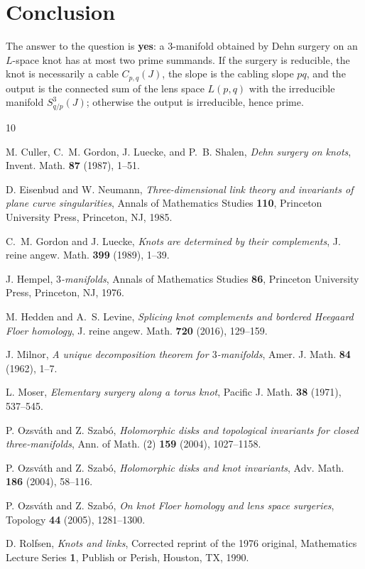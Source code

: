 \documentclass[11pt]{article}
\theoremstyle{definition}
\theoremstyle{remark}
\numberwithin{equation}{section}
\begin{document}
\section*{Conclusion}

The answer to the question is \textbf{yes}: a $3$-manifold obtained by
Dehn surgery on an $L$-space knot has at most two prime summands.  If
the surgery is reducible, the knot is necessarily a cable $C_{p,q}(J)$,
the slope is the cabling slope $pq$, and the output is the connected sum
of the lens space $L(p,q)$ with the irreducible manifold
$S^{3}_{q/p}(J)$; otherwise the output is irreducible, hence prime.

\begin{thebibliography}{10}

M. Culler, C.~M. Gordon, J. Luecke, and P.~B. Shalen,
\emph{Dehn surgery on knots},
Invent. Math. \textbf{87} (1987), 1--51.

D. Eisenbud and W. Neumann,
\emph{Three-dimensional link theory and invariants of plane curve
singularities},
Annals of Mathematics Studies \textbf{110}, Princeton University Press,
Princeton, NJ, 1985.

C.~M. Gordon and J. Luecke,
\emph{Knots are determined by their complements},
J. reine angew. Math. \textbf{399} (1989), 1--39.

J. Hempel,
\emph{$3$-manifolds},
Annals of Mathematics Studies \textbf{86}, Princeton University Press,
Princeton, NJ, 1976.

M. Hedden and A.~S. Levine,
\emph{Splicing knot complements and bordered Heegaard Floer homology},
J. reine angew. Math. \textbf{720} (2016), 129--159.

J. Milnor,
\emph{A unique decomposition theorem for $3$-manifolds},
Amer. J. Math. \textbf{84} (1962), 1--7.

L. Moser,
\emph{Elementary surgery along a torus knot},
Pacific J. Math. \textbf{38} (1971), 537--545.

P. Ozsv\'ath and Z. Szab\'o,
\emph{Holomorphic disks and topological invariants for closed
three-manifolds},
Ann. of Math. (2) \textbf{159} (2004), 1027--1158.

P. Ozsv\'ath and Z. Szab\'o,
\emph{Holomorphic disks and knot invariants},
Adv. Math. \textbf{186} (2004), 58--116.

P. Ozsv\'ath and Z. Szab\'o,
\emph{On knot Floer homology and lens space surgeries},
Topology \textbf{44} (2005), 1281--1300.

D. Rolfsen,
\emph{Knots and links},
Corrected reprint of the 1976 original, Mathematics Lecture Series
\textbf{1}, Publish or Perish, Houston, TX, 1990.

\end{thebibliography}
\end{document}
